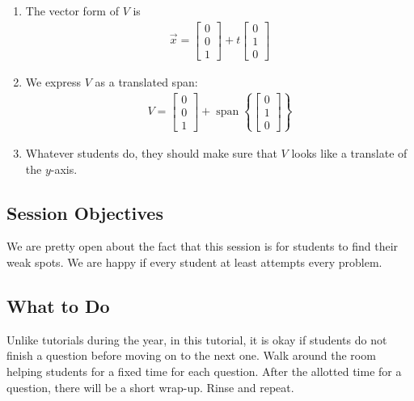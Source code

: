 \documentclass[red]{tutorial}
\newcommand{\R}{\mathbb{R}}
\newcommand{\mat}[1]{\begin{bmatrix} #1 %
\end{bmatrix}}
\DeclareMathOperator{\Span} {span}
\theoremstyle{definition}
\theoremstyle{theorem}
\begin{document}
{\begin{solutions}
\begin{enumerate}
\begin{enumerate}
\begin{equation*}
\begin{bmatrix}[rrr@{\enspace}|@{\enspace}r]
               1 & 0 & 0 & 0 \\
            \end{bmatrix}
          \end{equation*}
        \item
          The vector form of $V$ is
          \begin{align*}
            \vec x = \mat{0\\0\\1} + t\mat{0\\1\\0}
          \end{align*}
        \item
          We express $V$ as a translated span:
          \begin{align*}
            V = \mat{0\\0\\1} + \Span\left\{\mat{0\\1\\0}\right\}
          \end{align*}
        \item
          Whatever students do, they should make sure that $V$ looks like a
          translate of the $y$-axis.
      \end{enumerate}
  \end{enumerate}
\end{solutions}

\begin{instructions}
  \subsection*{Session Objectives}
  We are pretty open about the fact that this session is for students to find
  their weak spots. We are happy if every student at least attempts every
  problem.

  \subsection*{What to Do}
  Unlike tutorials during the year, in this tutorial, it is okay 
  if students do not finish a question before moving on to the next 
  one. Walk around the room helping students for a fixed time for 
  each question. After the allotted time for a question, there will 
  be a short wrap-up. Rinse and repeat.


\end{instructions}}
\end{document}
